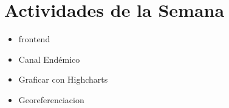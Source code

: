 \section{Actividades de la Semana}

\begin{itemize}
	\item frontend
	\item Canal Endémico
	\item Graficar con Highcharts
	\item Georeferenciacion

\end{itemize}

